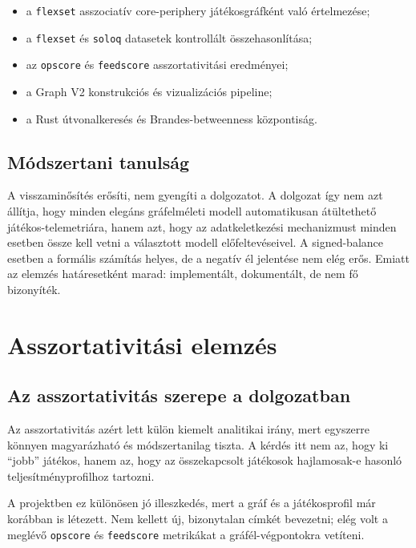 ﻿\documentclass[a4paper,12pt]{report}
\begin{document}
\begin{itemize}
    \item a \texttt{flexset} asszociatív core-periphery játékosgráfként való értelmezése;
    \item a \texttt{flexset} és \texttt{soloq} datasetek kontrollált összehasonlítása;
    \item az \texttt{opscore} és \texttt{feedscore} asszortativitási eredményei;
    \item a Graph V2 konstrukciós és vizualizációs pipeline;
    \item a Rust útvonalkeresés és Brandes-betweenness központiság.
\end{itemize}

\section{Módszertani tanulság}

A visszaminősítés erősíti, nem gyengíti a dolgozatot. A dolgozat így nem azt állítja, hogy minden elegáns gráfelméleti modell automatikusan átültethető játékos-telemetriára, hanem azt, hogy az adatkeletkezési mechanizmust minden esetben össze kell vetni a választott modell előfeltevéseivel. A signed-balance esetben a formális számítás helyes, de a negatív él jelentése nem elég erős. Emiatt az elemzés határesetként marad: implementált, dokumentált, de nem fő bizonyíték.

\chapter{Asszortativitási elemzés}

\section{Az asszortativitás szerepe a dolgozatban}

Az asszortativitás azért lett külön kiemelt analitikai irány, mert egyszerre könnyen magyarázható és módszertanilag tiszta. A kérdés itt nem az, hogy ki ``jobb'' játékos, hanem az, hogy az összekapcsolt játékosok hajlamosak-e hasonló teljesítményprofilhoz tartozni.

A projektben ez különösen jó illeszkedés, mert a gráf és a játékosprofil már korábban is létezett. Nem kellett új, bizonytalan címkét bevezetni; elég volt a meglévő \texttt{opscore} és \texttt{feedscore} metrikákat a gráfél-végpontokra vetíteni.
\end{document}

